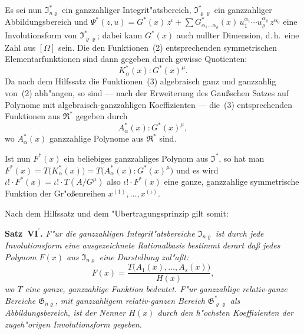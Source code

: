 \documentclass[11pt,a4paper]{article}
\begin{document}
Es sei nun $\mathfrak{I}_{n\varrho}^{*}$ ein ganzzahliger Integrit"{a}tsbereich, $\mathfrak{I}_{\varrho\varrho}^{*}$ ein ganzzahliger
Abbildungsbereich und
$\Psi^{*}(z,u)=G^{*}(x)\,z^{\iota}+\sum G_{\alpha_{1}\dots\alpha_{\varrho}}^{*}(x)\,u_{1}^{\alpha_{1}}\cdots u_{\varrho}^{\alpha_{\varrho}}\,z^{\alpha_{0}}$
eine Involutionsform von $\mathfrak{I}_{\varrho\varrho}^{*}$; dabei kann $G^{*}(x)$ auch nullter Dimension,
d.\,h.\ eine Zahl aus $[\Omega]$ sein. Die den Funktionen~(2) entsprechenden
symmetrischen Elementarfunktionen sind dann gegeben durch gewisse
Quotienten:
\begin{equation}
K_{\alpha}^{*}(x):G^{*}(x)^{\mu}.
\tag{4}
\end{equation}
Da nach dem Hilfssatz die Funktionen~(3) algebraisch ganz und
ganzzahlig von~(2) abh"{a}ngen, so sind --- nach der Erweiterung des
Gau\ss{}schen Satzes auf Polynome mit algebraisch-ganzzahligen Koeffizienten ---
die~(3) entsprechenden Funktionen aus $\mathfrak{R}^{*}$ gegeben durch
\begin{equation}
A_{\alpha}^{*}(x):G^{*}(x)^{\mu},
\tag{5}
\end{equation}
wo $A_{\alpha}^{*}(x)$ ganzzahlige Polynome aus $\mathfrak{R}^{*}$ sind.

Ist nun $F^{*}(x)$ ein beliebiges ganzzahliges Polynom aus $\mathfrak{I}^{*}$, so hat man
$F^{*}(x)=T\bigl(K_{\alpha}^{*}(x)\bigr)=T\bigl(A_{\alpha}^{*}(x):G^{*}(x)^{\mu}\bigr)$
und es wird $\iota!\cdot F^{*}(x)=\iota!\cdot T(A/G^{\mu})$ also $\iota!\cdot F^{*}(x)$ eine
ganze, ganzzahlige symmetrische Funktion der Gr"{o}\ss{}enreihen $x^{(1)},\dots,x^{(\iota)}$.

Nach dem Hilfssatz und dem "{U}bertragungsprinzip gilt somit:

\medskip
\noindent
\textbf{Satz~$\mathbf{VI}^{\boldsymbol{\prime}}$.} \emph{F"{u}r die ganzzahligen Integrit"{a}tsbereiche $\mathfrak{I}_{n\varrho}$
ist durch jede Involutionsform eine ausgezeichnete Rationalbasis bestimmt
derart da\ss{} jedes Polynom $F(x)$ aus $\mathfrak{I}_{n\varrho}$ eine Darstellung zul"{a}\ss{}t:}
\begin{equation}
F(x)=\frac{T\bigl(A_{1}(x),\dots,A_{s}(x)\bigr)}{H(x)},
\tag{$*$}
\end{equation}
\emph{wo $T$ eine ganze, ganzzahlige Funktion bedeutet. F"{u}r ganzzahlige
relativ-ganze Bereiche $\mathfrak{G}_{n\varrho}$, mit ganzzahligem relativ-ganzen Bereich $\mathfrak{G}_{\varrho\varrho}^{*}$
als Abbildungsbereich, ist der Nenner $H(x)$ durch den h"{o}chsten Koeffizienten
der zugeh"{o}rigen Involutionsform gegeben.}
\end{document}
